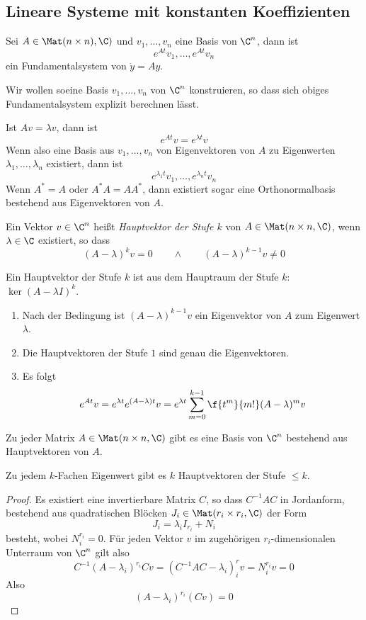 \documentclass[a4paper,10pt]{scrbook}
\begin{document}
\subsection{Lineare Systeme mit konstanten Koeffizienten}


Sei $A\in \Mat(n\times n),\C)$ und $v_1,\dotsc,v_n$ eine Basis von $\C^n$, dann ist
\[
	e^{At}v_1, \dotsc, e^{At}v_n
\]
ein Fundamentalsystem von $\dot y= Ay$.

Wir wollen soeine Basis $v_1,\dotsc, v_n$ von $\C^n$ konstruieren, so dass sich obiges Fundamentalsystem explizit berechnen lässt.

Ist $Av = \lambda v$, dann ist
\[
	e^{At}v = e^{\lambda t}v
\]
Wenn also eine Basis aus $v_1,\dotsc, v_n$ von Eigenvektoren von $A$ zu Eigenwerten $\lambda_1,\dotsc, \lambda_n$ existiert, dann ist
\[
	e^{\lambda_1 t}v_1, \dotsc, e^{\lambda_n t}v_n
\]
Wenn $A^* = A$ oder $A^*A = AA^*$, dann existiert sogar eine Orthonormalbasis bestehend aus Eigenvektoren von $A$.

\begin{df*}
	Ein Vektor $v\in \C^n$ heißt \emph{Hauptvektor der Stufe $k$} von $A\in \Mat(n\times n,\C)$, wenn $\lambda \in \C$ existiert, so dass
	\[
		(A-\lambda)^kv = 0 \qquad \land \qquad (A-\lambda)^{k-1}v \neq 0
	\]
	\begin{note}
		Ein Hauptvektor der Stufe $k$ ist aus dem Hauptraum der Stufe $k$: $\ker(A-\lambda I)^k$.
	\end{note}
	\begin{note}
		\begin{enumerate}[1)]
			\item
				Nach der Bedingung ist $(A-\lambda)^{k-1}v$ ein Eigenvektor von $A$ zum Eigenwert $\lambda$.
			\item
				Die Hauptvektoren der Stufe $1$ sind genau die Eigenvektoren.
			\item
				Es folgt
				\[
					e^{At}v = e^{\lambda t}e^{(A-\lambda)t}v = e^{\lambda t} \sum_{m=0}^{k-1}\f{t^m}{m!}(A-\lambda)^m v
				\]
		\end{enumerate}
	\end{note}
\end{df*}


\begin{st}
	\label{17.12}
	Zu jeder Matrix $A\in \Mat(n\times n,\C)$ gibt es eine Basis von $\C^n$ bestehend aus Hauptvektoren von $A$.

	Zu jedem $k$-Fachen Eigenwert gibt es $k$ Hauptvektoren der Stufe $\le k$.
	\begin{proof}
		Es existiert eine invertierbare Matrix $C$, so dass $C^{-1}AC$ in Jordanform, bestehend aus quadratischen Blöcken $J_i\in \Mat(r_i\times r_i, \C)$ der Form
		\[
			J_i = \lambda_i I_{r_i} + N_i
		\]
		besteht, wobei $N_i^{r_i} = 0$.
		Für jeden Vektor $v$ im zugehörigen $r_i$-dimensionalen Unterraum von $\C^n$ gilt also
		\[
			C^{-1}(A-\lambda_i)^{r_i}Cv = (C^{-1}AC - \lambda_i)^r_i v = N_i^{r_i}v = 0
		\]
		Also
		\[
			(A-\lambda_i)^{r_i}(Cv) = 0
		\]
	\end{proof}
\end{st}
\end{document}
